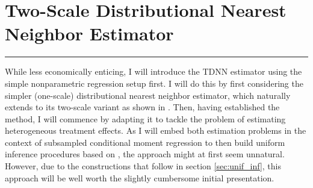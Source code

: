 \section{Two-Scale Distributional Nearest Neighbor Estimator}\label{sec:TDNN}
\hrule
While less economically enticing, I will introduce the TDNN estimator using the simple nonparametric regression setup first.
I will do this by first considering the simpler (one-scale) distributional nearest neighbor estimator, which naturally extends to its two-scale variant as shown in \citet{demirkaya_optimal_2024}.
Then, having established the method, I will commence by adapting it to tackle the problem of estimating heterogeneous treatment effects.
As I will embed both estimation problems in the context of subsampled conditional moment regression to then build uniform inference procedures based on \citet{ritzwoller_uniform_2024}, the approach might at first seem unnatural.
However, due to the constructions that follow in section \ref{sec:unif_inf}, this approach will be well worth the slightly cumbersome initial presentation.

